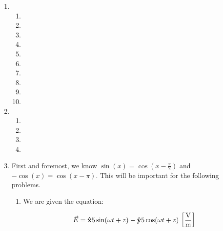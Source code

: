 \begin{enumerate}

  \item

    \begin{enumerate}

      \item 

      \item 

      \item 

      \item 

      \item 

      \item 

      \item 

      \item 

      \item 

      \item 

    \end{enumerate}

  \item

    \begin{enumerate}

      \item 

      \item 

      \item 

      \item 

    \end{enumerate}

  \item

        First and foremost, we know $\sin(x)=\cos\left( x-\frac{\pi}{2} \right)$ and $-\cos(x)=\cos(x-\pi)$. This will be important for the following problems.

    \begin{enumerate}

      \item 

        We are given the equation:

        $$\vec{E}=\bold{\hat{x}}5\sin(\omega t + z)-\bold{\hat{y}}5\cos(\omega t + z)\,\left[ \frac{\si{\volt}}{\si{\meter}} \right]$$


\end{enumerate}
\end{enumerate}
